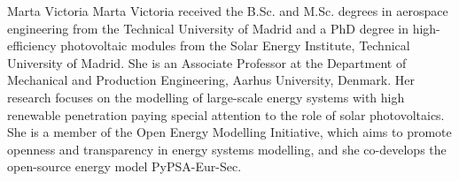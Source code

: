 \documentclass[lettersize,journal]{IEEEtran}
\begin{document}
\vspace{11pt}

\begin{IEEEbiographynophoto}{Marta Victoria}
Marta Victoria received the B.Sc. and M.Sc. degrees in aerospace engineering from the Technical University of Madrid and a PhD degree in high-efficiency photovoltaic modules from the Solar Energy Institute, Technical University of Madrid. She is an Associate Professor at the Department of Mechanical and Production Engineering, Aarhus University, Denmark. Her research focuses on the modelling of large-scale energy systems with high renewable penetration paying special attention to the role of solar photovoltaics. She is a member of the Open Energy Modelling Initiative, which aims to promote openness and transparency in energy systems modelling, and she co-develops the open-source energy model PyPSA-Eur-Sec.
\end{IEEEbiographynophoto}



\vfill
\end{document}

